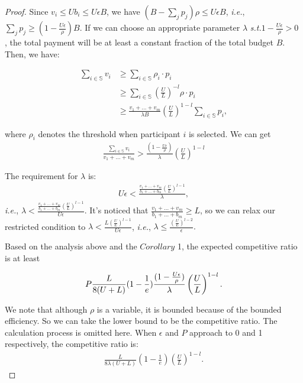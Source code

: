 \documentclass[conference,compsocconf,letterpaper,10pt]{IEEEtran}
\newcommand{\ie}{{\em i.e.}}
\newcommand{\st}{{\em s.t.}}
\begin{document}
\begin{proof}
Since $v_i \le Ub_i \le U\epsilon B$, we have $(B-\sum_j{p_j})\rho \le U\epsilon B$, \ie, $\sum_j{p_j} \ge (1-\frac{U\epsilon}{\rho})B$. If we can choose an appropriate parameter $\lambda$  \st  $1-\frac{U\epsilon}{\rho} > 0$ , the total payment will be at least a constant fraction of the total budget $B$. Then, we have:
\begin{small}
\begin{align}
\nonumber \sum_{i \in\mathbb{S}} v_i &\ge \sum_{i \in\mathbb{S}}\rho_{i} \cdot p_i \\
\nonumber &\ge \sum_{i \in\mathbb{S}}\left(\frac{U}{L}\right)^{-l}\rho \cdot p_i\\
&\ge \frac{v_1+\dots+v_m}{\lambda B}\left(\frac{U}{L}\right)^{1-l}\sum_{i \in\mathbb{S}}p_i,
\end{align}
\end{small}
where $\rho_i$ denotes the threshold when participant $i$ is selected. We can get
\begin{eqnarray}
\frac{\sum_{i \in\mathbb{S}}v_i}{v_1+\dots+v_m} > \frac{ (1-\frac{U\epsilon}{\rho})}{\lambda}\left(\frac{U}{L}\right)^{1-l}
\end{eqnarray}

The requirement for $\lambda$ is:
\begin{align}
 \nonumber U\epsilon < \frac{\frac{v_1+\dots+v_m}{b_1+\dots+b_m}\left(\frac{U}{L}\right)^{l-1}}{\lambda}, 
 \end{align}
 \ie, $ \lambda < \frac{\frac{v_1+\dots+v_m}{b_1+\dots+b_m}\left(\frac{U}{L}\right)^{l-1}}{U\epsilon}. $  It's noticed that $\frac{v_1+\dots+v_m}{b_1+\dots+b_m} \ge L$, so we can relax our restricted condition to $ \lambda < \frac{L\left(\frac{U}{L}\right)^{l-1}}{U\epsilon}$, \ie, $\lambda \le \frac{\left(\frac{U}{L}\right)^{l-2}}{\epsilon}.$

Based on the analysis above and the $Corollary$ 1, the expected competitive ratio is at least
\begin{small}
\begin{eqnarray}
\small
P\frac{L}{8(U+L)}(1-\frac{1}{e})\frac{ (1-\frac{U\epsilon}{\rho })}{\lambda}\left(\frac{U}{L}\right)^{1-l}.
\end{eqnarray}
\end{small}

We note that although $\rho$ is a variable, it is bounded because of the bounded efficiency. So we can take the lower bound to be the competitive ratio. The calculation process is omitted here. When $\epsilon$ and $P$ approach to 0 and 1 respectively, the competitive ratio is:
\begin{eqnarray}
\frac{L}{8\lambda(U+L)}(1-\frac{1}{e})\left(\frac{U}{L}\right)^{1-l}.
\end{eqnarray}


\end{proof}
\end{document}
